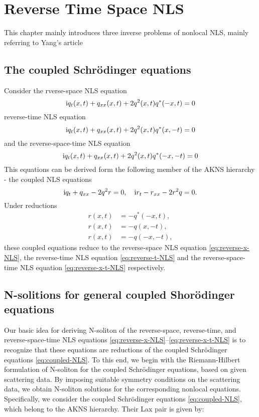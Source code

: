 \chapter{Reverse Time Space NLS}
This chapter mainly introduces three inverse problems of nonlocal NLS, mainly referring to Yang's article\cite{YANG2019328}
\section{The coupled Schrödinger equations}
Consider the rverse-space NLS equation
\begin{equation}
    \mathrm{i} q_{t}(x,t) + q_{xx}(x,t) + 2 q^{2}(x,t) q^{*}(-x,t) = 0 \label{eq:reverse-x-NLS}
\end{equation}
reverse-time NLS equation
\begin{equation}
    \mathrm{i} q_{t}(x,t) + q_{xx}(x,t) + 2 q^{2}(x,t) q^{*}(x,-t) = 0 \label{eq:reverse-t-NLS}
\end{equation}
and the reverse-space-time NLS equation
\begin{equation}
    \mathrm{i} q_{t}(x,t) + q_{xx}(x,t) + 2 q^{2}(x,t) q^{*}(-x,-t) = 0 \label{eq:reverse-x-t-NLS}
\end{equation}
This equations can be derived form the following member of the AKNS hierarchy - the coupled NLS equations
\begin{equation}
    \mathrm{i} q_{t} + q_{xx} - 2q^{2}r = 0, \quad \mathrm{i} r_{t} - r_{xx} - 2r^{2}q = 0. \label{eq:coupled-NLS}
\end{equation}
Under reductions
\begin{subequations}
\begin{align}
    r(x,t) &= -q^{*}(-x,t), \label{eq:reverse-x-NLS-reduction}\\
    r(x,t) &= -q(x,-t), \label{eq:reverse-t-NLS-reduction}\\
    r(x,t) &= -q(-x,-t), \label{eq:reverse-x-t-NLS-reduction}
\end{align}
\end{subequations}
these coupled equations reduce to the reverse-space NLS equation \eqref{eq:reverse-x-NLS}, the reverse-time NLS equation \eqref{eq:reverse-t-NLS} and the reverse-space-time NLS equation \eqref{eq:reverse-x-t-NLS} respectively.

\section{N-solitions for general coupled Shorödinger equations}
Our basic idea for deriving N-soliton of the reverse-space, reverse-time, and reverse-space-time NLS equations \eqref{eq:reverse-x-NLS}–\eqref{eq:reverse-x-t-NLS} is to recognize that these equations are reductions of the coupled Schrödinger equations \eqref{eq:coupled-NLS}. To this end, we begin with the Riemann-Hilbert formulation of N-soliton for the coupled Schrödinger equations, based on given scattering data. By imposing suitable symmetry conditions on the scattering data, we obtain N-soliton solutions for the corresponding nonlocal equations. Specifically, we consider the coupled Schrödinger equations \eqref{eq:coupled-NLS}, which belong to the AKNS hierarchy. Their Lax pair is given by:

